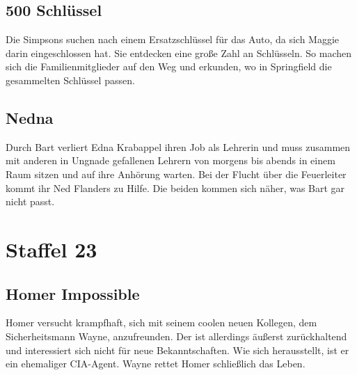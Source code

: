 
\subsection{500 Schlüssel}
Die Simpsons suchen nach einem Ersatzschlüssel für das Auto, da sich Maggie darin eingeschlossen hat. Sie entdecken eine große Zahl an Schlüsseln. So machen sich die Familienmitglieder auf den Weg und erkunden, wo in Springfield die gesammelten Schlüssel passen.



\subsection{Nedna}
Durch Bart verliert Edna Krabappel ihren Job als Lehrerin und muss zusammen mit anderen in Ungnade gefallenen Lehrern von morgens bis abends in einem Raum sitzen und auf ihre Anhörung warten. Bei der Flucht über die Feuerleiter kommt ihr Ned Flanders zu Hilfe. Die beiden kommen sich näher, was Bart gar nicht passt. 


\section{Staffel 23}

\subsection{Homer Impossible}
Homer versucht krampfhaft, sich mit seinem coolen neuen Kollegen, dem Sicherheitsmann Wayne, anzufreunden. Der ist allerdings äußerst zurückhaltend und interessiert sich nicht für neue Bekanntschaften. Wie sich herausstellt, ist er ein ehemaliger CIA-Agent. Wayne rettet Homer schließlich das Leben.


